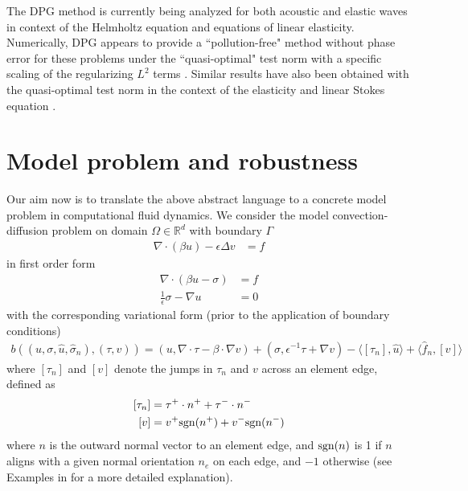 \documentclass[11pt,onecolumn]{scrartcl}
\newcommand{\grad}{\nabla}
\renewcommand{\div}{\grad \cdot}
\begin{document}
The DPG method is currently being analyzed for both acoustic and elastic waves in context of the Helmholtz equation and equations of linear elasticity.  Numerically, DPG appears to provide a ``pollution-free" method without phase error for these problems under the ``quasi-optimal" test norm with a specific scaling of the regularizing $L^2$ terms \cite{DPG4}. Similar results have also been obtained with the quasi-optimal test norm in the context of the elasticity \cite{DPGElas} and linear Stokes equation \cite{Camellia}. 

\section{Model problem and robustness}

Our aim now is to translate the above abstract language to a concrete model problem in computational fluid dynamics.  We consider the model convection-diffusion problem on domain $\Omega \in \mathbb{R}^d$ with boundary $\Gamma$
\begin{align}
\div (\beta u) - \epsilon\Delta v &= f  \label{primal}
\end{align}
in first order form
\begin{align*}
\div (\beta u - \sigma) &= f  \\
\frac{1}{\epsilon}\sigma - \grad u &= 0
\end{align*}
with the corresponding variational form (prior to the application of boundary conditions)
\begin{align*}
b\left(\left(u,\sigma, \widehat{u}, \widehat{\sigma}_n\right), \left(\tau, v\right)\right) = \left(u,\div \tau - \beta \cdot \grad v\right) + \left(\sigma, \epsilon^{-1} \tau + \grad v\right) - \langle \left[\tau_n\right], \widehat{u} \rangle + \langle \widehat{f}_n, \left[v\right] \rangle 
\end{align*}
where $\left[ \tau_n \right]$ and $\left[ v\right]$ denote the jumps in $\tau_n$ and $v$ across an element edge, defined as
\begin{align*}
\left[ \tau_n \right] &= \tau^+ \cdot n^+ + \tau^-\cdot n^-\\
\left[ v\right] &= v^+{\rm sgn}(n^+) + v^-{\rm sgn}(n^-)
\end{align*}
where $n$ is the outward normal vector to an element edge, and ${\rm sgn}(n)$ is 1 if $n$ aligns with a given normal orientation $n_e$ on each edge, and $-1$ otherwise (see Examples in \cite{DPGFriedrichs} for a more detailed explanation).  
\end{document}
